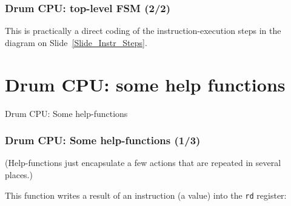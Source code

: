 
\begin{frame}[fragile]
\frametitle{Drum CPU: top-level FSM (2/2)}

\footnotesize

\begin{minipage}{0.5\textwidth}
\end{minipage}
\hm
\begin{minipage}{0.45\textwidth}
 This is practically a direct coding of the instruction-execution steps
 in the diagram on Slide~\ref{Slide_Instr_Steps}.
\end{minipage}


\end{frame}


\section{Drum CPU: some help functions}

\begin{frame}[fragile]

\begin{center}
  {\LARGE Drum CPU: Some help-functions}
\end{center}

\end{frame}


\begin{frame}[fragile]
\frametitle{Drum CPU: Some help-functions (1/3)}

\footnotesize

(Help-functions just encapsulate a few actions that are repeated in several places.)

\vspace{5ex}

This function writes a result of an instruction (a value) into the {\tt rd} register:

\vspace{4ex}

\begin{minipage}{0.725\textwidth}
\end{minipage}

\end{frame}

